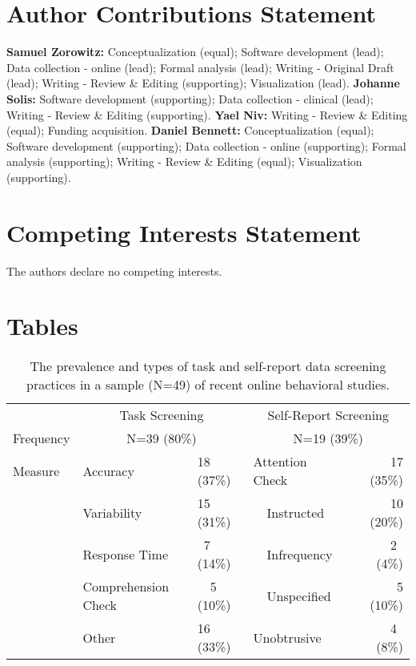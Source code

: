 \documentclass[a4paper,notitlepage,12pt]{article}
\begin{document}
\section*{Author Contributions Statement}

\textbf{Samuel Zorowitz:} Conceptualization (equal); Software development (lead); Data collection - online (lead); Formal analysis (lead); Writing - Original Draft (lead); Writing - Review \& Editing (supporting); Visualization (lead). \textbf{Johanne Solis:} Software development (supporting); Data collection - clinical (lead); Writing - Review \& Editing (supporting). \textbf{Yael Niv:} Writing - Review \& Editing (equal); Funding acquisition. \textbf{Daniel Bennett:} Conceptualization (equal); Software development (supporting); Data collection - online (supporting); Formal analysis (supporting); Writing - Review \& Editing (equal); Visualization (supporting).

\section*{Competing Interests Statement}

The authors declare no competing interests.

\clearpage
\section*{Tables}

\begin{table}[h]
    \centering
    \small
    \setlength{\tabcolsep}{8pt}
    \begin{tabular}{lllrllr}
        \toprule
        & \multicolumn{2}{c}{Task Screening} & \multicolumn{4}{c}{Self-Report Screening} \\
        \cmidrule(lr){2-3} \cmidrule(lr){4-7}
        Frequency & \multicolumn{2}{c}{N=39 (80\%)} & \multicolumn{4}{c}{N=19 (39\%)} \\
        \midrule
        Measure & Accuracy & 18 (37\%) & \multicolumn{2}{l}{Attention Check} & & 17 (35\%) \\
        & Variability & 15 (31\%) & & Instructed & & 10 (20\%) \\
        & Response Time & \ 7 (14\%) & & Infrequency & & 2 \, (4\%) \\
        & Comprehension Check & \ \ 5 (10\%) & & Unspecified & & 5 (10\%) \\
        & Other & 16 (33\%) & \multicolumn{2}{l}{Unobtrusive} & & \ 4 \, (8\%) \\
        \bottomrule
    \end{tabular}
    \caption{The prevalence and types of task and self-report data screening practices in a sample (N=49) of recent online behavioral studies.}
    \label{tab:tab01}
\end{table}
\end{document}
